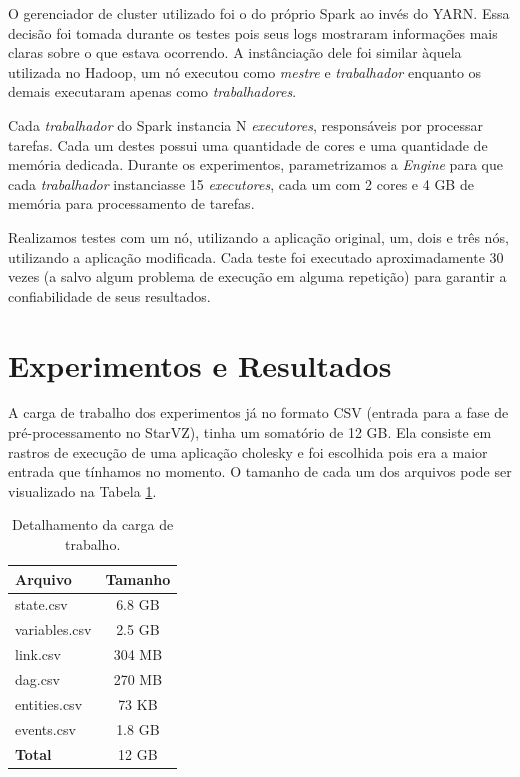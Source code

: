 O gerenciador de cluster utilizado foi o do próprio Spark ao invés do YARN. 
Essa decisão foi tomada durante os testes pois seus logs mostraram 
informações mais claras sobre o que estava ocorrendo. A instânciação dele foi 
similar àquela utilizada no Hadoop, um nó executou como \emph{mestre} e 
\emph{trabalhador} enquanto os demais executaram apenas como 
\emph{trabalhadores}. 

Cada \emph{trabalhador} do Spark instancia N \emph{executores}, responsáveis 
por processar tarefas. Cada um destes possui uma quantidade de cores e uma 
quantidade de memória dedicada. Durante os experimentos, parametrizamos a 
\emph{Engine} para que cada \emph{trabalhador} instanciasse 15 
\emph{executores}, cada um com 2 cores e 4 GB de memória para processamento de 
tarefas.

Realizamos testes com um nó, utilizando a aplicação original, um, dois e três 
nós, utilizando a aplicação modificada. Cada teste foi executado 
aproximadamente 30 vezes (a salvo algum problema de execução em alguma 
repetição) para garantir a confiabilidade de seus resultados. 


\section{Experimentos e Resultados} \label{sect:results}

A carga de trabalho dos experimentos já no formato CSV (entrada para a fase de 
pré-processamento no StarVZ), tinha um somatório de 12 GB. Ela consiste em 
rastros de execução de uma aplicação cholesky e foi escolhida pois era a maior
entrada que tínhamos no momento. O tamanho de cada um dos arquivos pode ser 
visualizado na Tabela \ref{tab:input_sz}.

\begin{table}[H]
\centering
\begin{tabular}{l c} \toprule
\textbf{Arquivo}  &  \textbf{Tamanho} \\ 
\midrule
state.csv	& 6.8 GB \\
variables.csv  	& 2.5 GB \\
link.csv       	& 304 MB \\
dag.csv        	& 270 MB \\
entities.csv	& 73 KB \\
events.csv	& 1.8 GB \\
\textbf{Total}  & 12 GB  \\
\end{tabular}
\caption{Detalhamento da carga de trabalho.}
\label{tab:input_sz}
\end{table}

